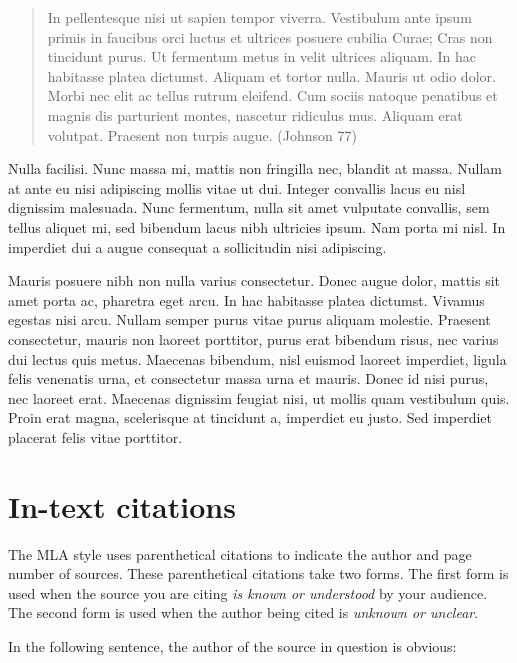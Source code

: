 \begin{Spacing}{2}
\begin{quote}In pellentesque nisi ut sapien tempor viverra. Vestibulum ante ipsum primis in faucibus orci luctus et ultrices posuere cubilia Curae; Cras non tincidunt purus. Ut fermentum metus in velit ultrices aliquam. In hac habitasse platea dictumst. Aliquam et tortor nulla. Mauris ut odio dolor. Morbi nec elit ac tellus rutrum eleifend. Cum sociis natoque penatibus et magnis dis parturient montes, nascetur ridiculus mus. Aliquam erat volutpat. Praesent non turpis augue. (Johnson 77)
\end{quote}

Nulla facilisi. Nunc massa mi, mattis non fringilla nec, blandit at massa. Nullam at ante eu nisi adipiscing mollis vitae ut dui. Integer convallis lacus eu nisl dignissim malesuada. Nunc fermentum, nulla sit amet vulputate convallis, sem tellus aliquet mi, sed bibendum lacus nibh ultricies ipsum. Nam porta mi nisl. In imperdiet dui a augue consequat a sollicitudin nisi adipiscing.

\hspace{.4in}Mauris posuere nibh non nulla varius consectetur. Donec augue dolor, mattis sit amet porta ac, pharetra eget arcu. In hac habitasse platea dictumst. Vivamus egestas nisi arcu. Nullam semper purus vitae purus aliquam molestie. Praesent consectetur, mauris non laoreet porttitor, purus erat bibendum risus, nec varius dui lectus quis metus. Maecenas bibendum, nisl euismod laoreet imperdiet, ligula felis venenatis urna, et consectetur massa urna et mauris. Donec id nisi purus, nec laoreet erat. Maecenas dignissim feugiat nisi, ut mollis quam vestibulum quis. Proin erat magna, scelerisque at tincidunt a, imperdiet eu justo. Sed imperdiet placerat felis vitae porttitor.


\end{Spacing}
\newpage

\section{In-text citations}
The MLA style uses parenthetical citations to indicate the author and page number of sources. These parenthetical citations take two forms. The first form is used when the source you are citing \emph{is known or understood} by your audience. The second form is used when the author being cited is \emph{unknown or unclear}. 

In the following sentence, the author of the source in question is obvious:

